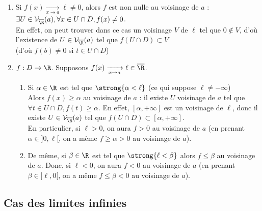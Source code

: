 \documentclass[12pt,a4paper]{report}
\begin{document}
\begin{remarque}{}
\begin{enumerate}
	\item Si $f(x) \xrightarrow[x \to a]{} \ell \neq 0$, alors $f$ est non nulle au voisinage de $a$ : \\
		$\exists U \in \mathcal{V}_{\overline{\R}} (a), \forall x \in U \cap D, f(x) \neq 0$. \\
		En effet, on peut trouver dans ce cas un voisinage $V$ de $\ell$ tel que $0 \not \in V$, d'où l'existence de $U \in \mathcal{V}_{\overline{\R}} (a)$ tel que $f(U \cap D) \subset V$ \\
		(d'où $f(b) \neq 0$ si $t \in U \cap D$) \\
	\item $f : D \to \R$. Supposons $f(x) \xrightarrow[x \to a]{} \ell \in \overline{\R}$.
	\begin{enumerate}
		\item Si $\alpha \in \R$ est tel que $\strong{\alpha < \ell}$ (ce qui suppose $\ell \neq -\infty$) \\
			Alors $f(x) \geq \alpha$ au voisinage de $a$ : il existe $U$ voisinage de $a$ tel que $\forall t \in U \cap D, f(t) \geq \alpha$.
			En effet, $[\alpha , +\infty]$ est un voisinage de $\ell$, donc il existe $U \in \mathcal{V}_{\overline{\R}}(a)$ tel que $f(U \cap D) \subset [\alpha,+\infty]$. \\
			En particulier, si $\ell > 0$, on aura $f > 0$ au voisinage de $a$ (en prenant $\alpha \in ]0,\ell[$, on a même $f \geq \alpha > 0$ au voisinage de $a$).
		\item De même, si $\beta \in \R$ est tel que $\strong{\ell < \beta}$ alors $f \leq \beta$ au voisinage de $a$. Donc, si $\ell < 0$, on aura $f < 0$ au voisinage de $a$ (en prenant $\beta \in ]\ell, 0[$, on a même $f \leq \beta < 0$ au voisinage de $a$).
	\end{enumerate}
		
\end{enumerate}
\end{remarque}

\subsection{Cas des limites infinies}
\end{document}
